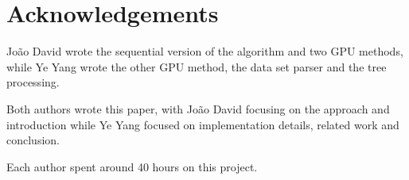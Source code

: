 \documentclass[runningheads]{llncs}
\begin{document}
\section*{Acknowledgements}

João David wrote the sequential version of the algorithm and two GPU methods, while Ye Yang wrote the other GPU method, the data set parser and the tree processing.

Both authors wrote this paper, with João David focusing on the approach and introduction while Ye Yang focused on implementation details, related work and conclusion.

Each author spent around 40 hours on this project.

\pagebreak

\nocite{*}


\end{document}
